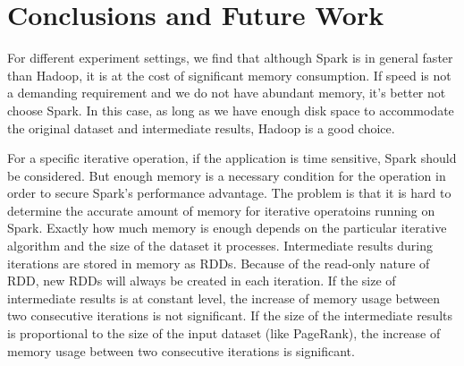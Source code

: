 \documentclass[12pt,conference,letterpaper]{IEEEtran}
\begin{document}
%







\section{Conclusions and Future Work}
\label{sec:concl_fw}

For different experiment settings,  we find that although Spark is in general faster than Hadoop, it is at the cost of significant memory consumption. If speed is not a demanding requirement and we do not have abundant memory, it's better not choose Spark.  In this case, as long as we have enough disk space to accommodate the original dataset and intermediate results, Hadoop is a good choice.

For a specific iterative operation, if the application is time sensitive, Spark should be considered. But  enough memory is a necessary condition for the operation in order to secure Spark's performance advantage. The problem is that it is hard to determine the accurate amount of memory for iterative operatoins running on Spark. Exactly how much memory is enough depends on the particular iterative algorithm and the size of the dataset it processes. Intermediate results during iterations are stored in memory as RDDs. Because of the read-only nature of RDD, new RDDs will always be created in each iteration. If the size of intermediate results is at constant level, the increase of memory usage between two consecutive iterations is not significant. If the size of the intermediate results is proportional to the size of the input dataset (like PageRank), the increase of memory usage between two consecutive iterations is significant.
\end{document}
